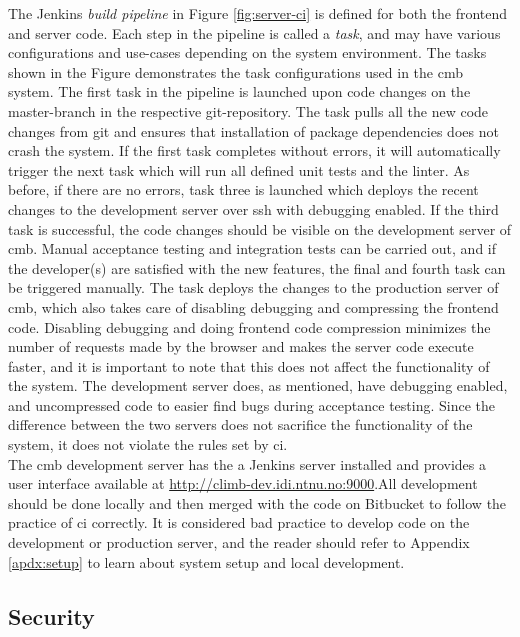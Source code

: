 The Jenkins \textit{build pipeline} in Figure \ref{fig:server-ci} is defined for both the frontend and server code. Each step in the pipeline is called a \textit{task}, and may have various configurations and use-cases depending on the system environment. The tasks shown in the Figure demonstrates the task configurations used in the \gls{cmb} system. The first task in the pipeline is launched upon code changes on the master-branch in the respective git-repository. The task pulls all the new code changes from git and ensures that installation of package dependencies does not crash the system. If the first task completes without errors, it will automatically trigger the next task which will run all defined unit tests and the linter. As before, if there are no errors, task three is launched which deploys the recent changes to the development server over \gls{ssh} with debugging enabled. If the third task is successful, the code changes should be visible on the development server of \gls{cmb}. Manual acceptance testing and integration tests can be carried out, and if the developer(s) are satisfied with the new features, the final and fourth task can be triggered manually. The task deploys the changes to the production server of \gls{cmb}, which also takes care of disabling debugging and compressing the frontend code. Disabling debugging and doing frontend code compression minimizes the number of requests made by the browser and makes the server code execute faster, and it is important to note that this does not affect the functionality of the system. The development server does, as mentioned, have debugging enabled, and uncompressed code to easier find bugs during acceptance testing. Since the difference between the two servers does not sacrifice the functionality of the system, it does not violate the rules set by \gls{ci}.  \\

The \gls{cmb} development server has the a Jenkins server installed and provides a user interface available at \url{http://climb-dev.idi.ntnu.no:9000}.All development should be done locally and then merged with the code on Bitbucket to follow the practice of \gls{ci} correctly. It is considered bad practice to develop code on the development or production server, and the reader should refer to Appendix \ref{apdx:setup} to learn about system setup and local development.

\subsection{Security}

